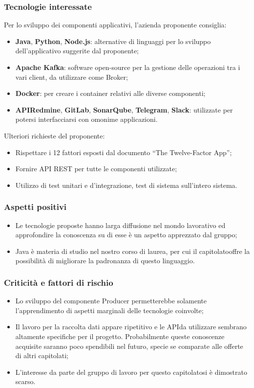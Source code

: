 \subsubsection{Tecnologie interessate}
Per lo sviluppo dei componenti applicativi, l'azienda proponente consiglia:
\begin{itemize}
	\item \textbf{Java}, \textbf{Python}\glo, \textbf{Node.js}\glo: alternative di linguaggi per lo sviluppo dell'applicativo suggerite dal proponente; 
	\item\textbf{Apache Kafka}\glo : software open-source per la gestione delle operazioni tra i vari client, da utilizzare come Broker;
	\item \textbf{Docker}\glo: per creare i container relativi alle diverse componenti;
	\item \textbf{API\glosp Redmine}\glo,  \textbf{GitLab}\glo,  \textbf{SonarQube}\glo,  \textbf{Telegram}\glo, \textbf{Slack}\glo: utilizzate per potersi interfacciarsi con omonime applicazioni.
\end{itemize}
Ulteriori richieste del proponente:
\begin{itemize}
	\item Rispettare i 12 fattori esposti dal documento “The Twelve-Factor App”;
	\item Fornire API REST per tutte le componenti utilizzate; 
	\item Utilizzo di test unitari e d’integrazione, test di sistema sull’intero sistema.
\end{itemize}
\subsubsection{Aspetti positivi}
\begin{itemize}
	\item Le tecnologie proposte hanno larga diffusione nel mondo lavorativo ed
	 approfondire la conoscenza su di esse è un aspetto apprezzato dal gruppo;
	\item Java è materia di studio nel nostro corso di laurea, per cui il
	 capitolato\glosp offre la possibilità di migliorare la padronanza di questo
	 linguaggio.
\end{itemize}

\subsubsection{Criticità e fattori di rischio}
\begin{itemize}
	\item Lo sviluppo del componente Producer permetterebbe solamente l'apprendimento di aspetti marginali delle tecnologie coinvolte;
	\item Il lavoro per la raccolta dati appare ripetitivo 
	 e le API\glosp da utilizzare sembrano altamente specifiche per il progetto. Probabilmente queste conoscenze acquisite saranno poco spendibili nel futuro, specie se comparate alle offerte di altri capitolati;
	\item L'interesse da parte del gruppo di lavoro per questo capitolato\glosp si è dimostrato scarso.
\end{itemize}

